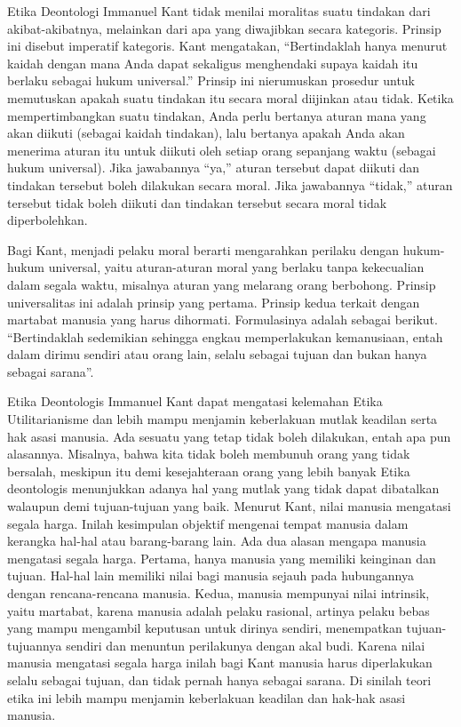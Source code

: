 \documentclass[11pt,twoside,a5paper,openany]{memoir}
\begin{document}
Etika Deontologi Immanuel Kant tidak menilai moralitas suatu tindakan
dari akibat-akibatnya, melainkan dari apa yang diwajibkan secara
kategoris. Prinsip ini disebut imperatif kategoris. Kant mengatakan,
``Bertindaklah hanya menurut kaidah dengan mana Anda dapat sekaligus
menghendaki supaya kaidah itu berlaku sebagai hukum universal.'' Prinsip
ini nierumuskan prosedur untuk memutuskan apakah suatu tindakan itu
secara moral diijinkan atau tidak. Ketika mempertimbangkan suatu
tindakan, Anda perlu bertanya aturan mana yang akan diikuti (sebagai
kaidah tindakan), lalu bertanya apakah Anda akan menerima aturan itu
untuk diikuti oleh setiap orang sepanjang waktu (sebagai hukum
universal). Jika jawabannya ``ya,'' aturan tersebut dapat diikuti dan
tindakan tersebut boleh dilakukan secara moral. Jika jawabannya
``tidak,'' aturan tersebut tidak boleh diikuti dan tindakan tersebut
secara moral tidak diperbolehkan.

Bagi Kant, menjadi pelaku moral berarti mengarahkan perilaku dengan
hukum-hukum universal, yaitu aturan-aturan moral yang berlaku tanpa
kekecualian dalam segala waktu, misalnya aturan yang melarang orang
berbohong. Prinsip universalitas ini adalah prinsip yang pertama.
Prinsip kedua terkait dengan martabat manusia yang harus dihormati.
Formulasinya adalah sebagai berikut. ``Bertindaklah sedemikian sehingga
engkau memperlakukan kemanusiaan, entah dalam dirimu sendiri atau orang
lain, selalu sebagai tujuan dan bukan hanya sebagai sarana''.

Etika Deontologis Immanuel Kant dapat mengatasi kelemahan Etika
Utilitarianisme dan lebih mampu menjamin keberlakuan mutlak keadilan
serta hak asasi manusia. Ada sesuatu yang tetap tidak boleh dilakukan,
entah apa pun alasannya. Misalnya, bahwa kita tidak boleh membunuh orang
yang tidak bersalah, meskipun itu demi kesejahteraan orang yang lebih
banyak Etika deontologis menunjukkan adanya hal yang mutlak yang tidak
dapat dibatalkan walaupun demi tujuan-tujuan yang baik. Menurut Kant,
nilai manusia mengatasi segala harga. Inilah kesimpulan objektif
mengenai tempat manusia dalam kerangka hal-hal atau barang-barang lain.
Ada dua alasan mengapa manusia mengatasi segala harga. Pertama, hanya
manusia yang memiliki keinginan dan tujuan. Hal-hal lain memiliki nilai
bagi manusia sejauh pada hubungannya dengan rencana-rencana manusia.
Kedua, manusia mempunyai nilai intrinsik, yaitu martabat, karena manusia
adalah pelaku rasional, artinya pelaku bebas yang mampu mengambil
keputusan untuk dirinya sendiri, menempatkan tujuan-tujuannya sendiri
dan menuntun perilakunya dengan akal budi. Karena nilai manusia
mengatasi segala harga inilah bagi Kant manusia harus diperlakukan
selalu sebagai tujuan, dan tidak pernah hanya sebagai sarana. Di sinilah
teori etika ini lebih mampu menjamin keberlakuan keadilan dan hak-hak
asasi manusia.
\end{document}
